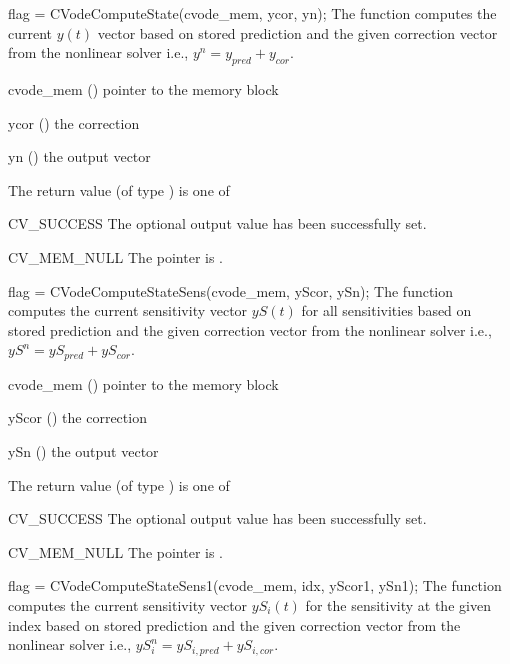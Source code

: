 {
  flag = CVodeComputeState(cvode\_mem, ycor, yn);
}
{
  The function computes the current $y(t)$ vector based on stored prediction and
  the given correction vector from the nonlinear solver i.e.,
  $y^n = y_{pred} + y_{cor}$.
}
{
  \begin{args}
    \item[cvode\_mem] () pointer to the {\cvodes} memory block
    \item[ycor] () the correction
    \item[yn] () the output vector
  \end{args}
}
{
  The return value  (of type ) is one of
  \begin{args}
  \item[CV\_SUCCESS]
    The optional output value has been successfully set.
  \item[CV\_MEM\_NULL]
    The  pointer is .
  \end{args}
}
{}
{
  flag = CVodeComputeStateSens(cvode\_mem, yScor, ySn);
}
{
  The function computes the current sensitivity vector $yS(t)$ for all
  sensitivities based on stored prediction and the given correction vector from
  the nonlinear solver i.e., $yS^n = yS_{pred} + yS_{cor}$.
}
{
  \begin{args}
    \item[cvode\_mem] () pointer to the {\cvodes} memory block
    \item[yScor] () the correction
    \item[ySn] () the output vector
  \end{args}
}
{
  The return value  (of type ) is one of
  \begin{args}
  \item[CV\_SUCCESS]
    The optional output value has been successfully set.
  \item[CV\_MEM\_NULL]
    The  pointer is .
  \end{args}
}
{}
{
  flag = CVodeComputeStateSens1(cvode\_mem, idx, yScor1, ySn1);
}
{
  The function computes the current sensitivity vector $yS_i(t)$ for the
  sensitivity at the given index based on stored prediction and the given
  correction vector from the nonlinear solver i.e.,
  $yS_i^n = yS_{i,pred} + yS_{i,cor}$.
}
